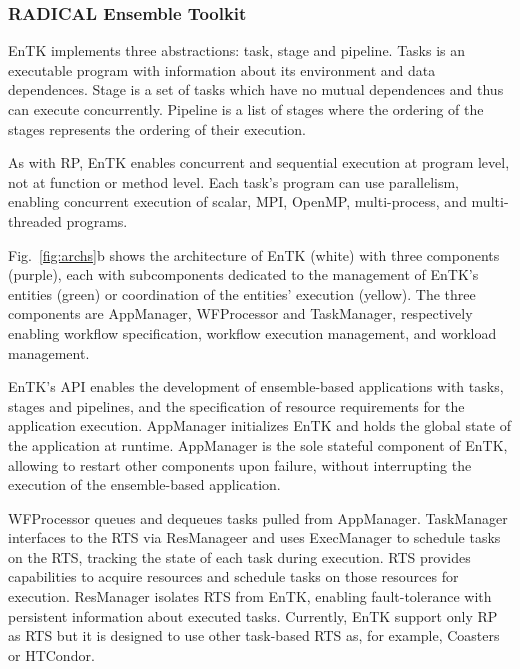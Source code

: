 \documentclass[preprint,12pt, a4paper]{elsarticle}
\begin{document}
\subsubsection{RADICAL Ensemble Toolkit}\label{sssec:arch_entk}

EnTK implements three abstractions: task, stage and pipeline. Tasks is an
executable program with information about its environment and data
dependences. Stage is a set of tasks which have no mutual dependences and
thus can execute concurrently. Pipeline is a list of stages where the
ordering of the stages represents the ordering of their execution.

As with RP, EnTK enables concurrent and sequential execution at program
level, not at function or method level. Each task's program can use
parallelism, enabling concurrent execution of scalar, MPI, OpenMP,
multi-process, and multi-threaded programs.


Fig.~\ref{fig:archs}b shows the architecture of EnTK (white) with three
components (purple), each with subcomponents dedicated to the management of
EnTK's entities (green) or coordination of the entities' execution (yellow).
The three components are AppManager, WFProcessor and TaskManager,
respectively enabling workflow specification, workflow execution management,
and workload management.

EnTK's API enables the development of ensemble-based applications with tasks,
stages and pipelines, and the specification of resource requirements for the
application execution. AppManager initializes EnTK and holds the global state
of the application at runtime. AppManager is the sole stateful component of
EnTK, allowing to restart other components upon failure, without interrupting
the execution of the ensemble-based application.

WFProcessor queues and dequeues tasks pulled from AppManager. TaskManager
interfaces to the RTS via ResManageer and uses ExecManager to schedule tasks
on the RTS, tracking the state of each task during execution. RTS provides
capabilities to acquire resources and schedule tasks on those resources for
execution. ResManager isolates RTS from EnTK, enabling fault-tolerance with
persistent information about executed tasks. Currently, EnTK support only RP
as RTS but it is designed to use other task-based RTS as, for example,
Coasters or HTCondor.
\end{document}
